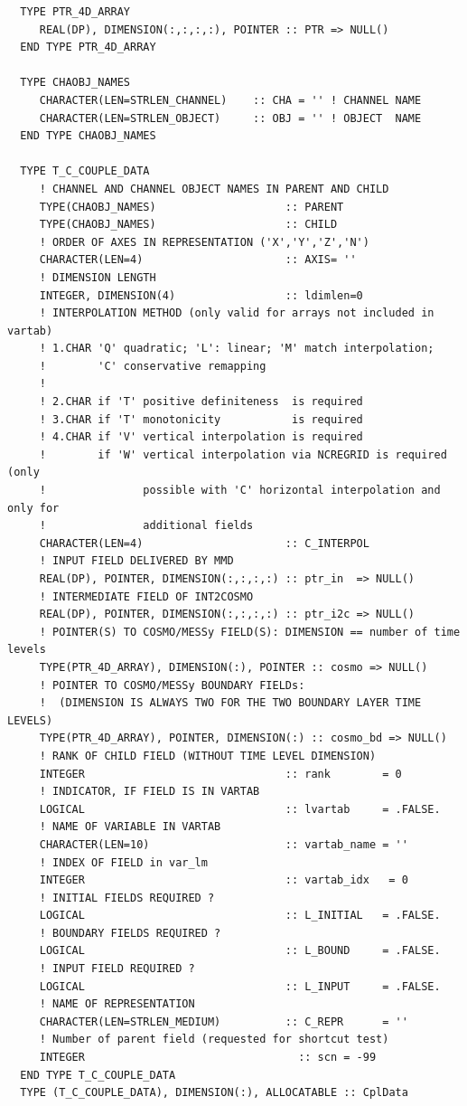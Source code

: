 \documentclass[11pt,twoside]{article}
\begin{document}
\begin{verbatim}
  TYPE PTR_4D_ARRAY
     REAL(DP), DIMENSION(:,:,:,:), POINTER :: PTR => NULL()
  END TYPE PTR_4D_ARRAY

  TYPE CHAOBJ_NAMES
     CHARACTER(LEN=STRLEN_CHANNEL)    :: CHA = '' ! CHANNEL NAME 
     CHARACTER(LEN=STRLEN_OBJECT)     :: OBJ = '' ! OBJECT  NAME 
  END TYPE CHAOBJ_NAMES

  TYPE T_C_COUPLE_DATA
     ! CHANNEL AND CHANNEL OBJECT NAMES IN PARENT AND CHILD   
     TYPE(CHAOBJ_NAMES)                    :: PARENT
     TYPE(CHAOBJ_NAMES)                    :: CHILD
     ! ORDER OF AXES IN REPRESENTATION ('X','Y','Z','N')
     CHARACTER(LEN=4)                      :: AXIS= '' 
     ! DIMENSION LENGTH
     INTEGER, DIMENSION(4)                 :: ldimlen=0 
     ! INTERPOLATION METHOD (only valid for arrays not included in vartab)
     ! 1.CHAR 'Q' quadratic; 'L': linear; 'M' match interpolation;
     !        'C' conservative remapping 
     ! 
     ! 2.CHAR if 'T' positive definiteness  is required
     ! 3.CHAR if 'T' monotonicity           is required
     ! 4.CHAR if 'V' vertical interpolation is required
     !        if 'W' vertical interpolation via NCREGRID is required (only
     !               possible with 'C' horizontal interpolation and only for
     !               additional fields
     CHARACTER(LEN=4)                      :: C_INTERPOL
     ! INPUT FIELD DELIVERED BY MMD
     REAL(DP), POINTER, DIMENSION(:,:,:,:) :: ptr_in  => NULL()
     ! INTERMEDIATE FIELD OF INT2COSMO
     REAL(DP), POINTER, DIMENSION(:,:,:,:) :: ptr_i2c => NULL()
     ! POINTER(S) TO COSMO/MESSy FIELD(S): DIMENSION == number of time levels
     TYPE(PTR_4D_ARRAY), DIMENSION(:), POINTER :: cosmo => NULL()
     ! POINTER TO COSMO/MESSy BOUNDARY FIELDs: 
     !  (DIMENSION IS ALWAYS TWO FOR THE TWO BOUNDARY LAYER TIME LEVELS)
     TYPE(PTR_4D_ARRAY), POINTER, DIMENSION(:) :: cosmo_bd => NULL()
     ! RANK OF CHILD FIELD (WITHOUT TIME LEVEL DIMENSION)
     INTEGER                               :: rank        = 0 
     ! INDICATOR, IF FIELD IS IN VARTAB
     LOGICAL                               :: lvartab     = .FALSE.
     ! NAME OF VARIABLE IN VARTAB
     CHARACTER(LEN=10)                     :: vartab_name = ''
     ! INDEX OF FIELD in var_lm
     INTEGER                               :: vartab_idx   = 0
     ! INITIAL FIELDS REQUIRED ?
     LOGICAL                               :: L_INITIAL   = .FALSE.
     ! BOUNDARY FIELDS REQUIRED ?
     LOGICAL                               :: L_BOUND     = .FALSE.
     ! INPUT FIELD REQUIRED ?
     LOGICAL                               :: L_INPUT     = .FALSE.
     ! NAME OF REPRESENTATION 
     CHARACTER(LEN=STRLEN_MEDIUM)          :: C_REPR      = '' 
     ! Number of parent field (requested for shortcut test)
     INTEGER                                 :: scn = -99
  END TYPE T_C_COUPLE_DATA
  TYPE (T_C_COUPLE_DATA), DIMENSION(:), ALLOCATABLE :: CplData
\end{verbatim}
\end{document}
